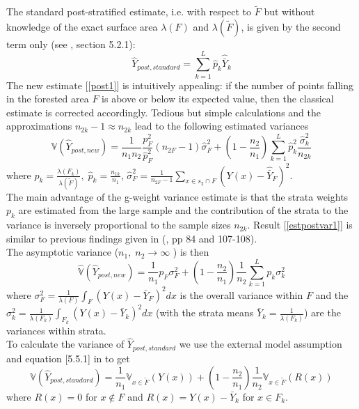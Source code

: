 \documentclass[a4paper,12pt,leqno, titlepage]{article}
\newcommand{\VAR}{\mathbb{V}}
\begin{document}
{{The standard post-stratified estimate, i.e. with respect to $\tilde{F}$ but without knowledge of the exact surface area $\lambda(F)$ and $\lambda(\tilde{F})$, is given by the second term only (see \cite{mandallaz}, section 5.2.1):
\begin{equation}\label{post2}
\hat{Y}_{post,standard}=\sum_{k=1}^L\hat{p}_k\hat{\bar{Y}}_k
\end{equation}
The new estimate [\ref{post1}] is intuitively appealing: if the number of points falling in the forested area $F$ is above or below its expected value, then the classical estimate is corrected accordingly.
Tedious but simple calculations and the approximations $ n_{2k}-1 \approx n_{2k}$ lead to the following estimated variances
\begin{equation}\label{estpostvar1}
\hat{\VAR}(\hat{Y}_{post,new})=\frac{1}{n_1n_2}\frac{p_F^2}{\hat{p}_F^2}(n_{2F}-1)\hat{\sigma}^2_F+
(1-\frac{n_2}{n_1})\sum_{k=1}^L\hat{p}^2_k\frac{\hat{\sigma}_k^2}{n_{2k}}
\end{equation}
where $p_k=\frac{\lambda(F_k)}{\lambda(\tilde{F})},\; \hat{p}_k=\frac{n_{1k}}{n_1}$,
$\hat{\sigma}_F^2=\frac{1}{n_{2F}-1}\sum_{x\in{s_2}\cap F} (Y(x)-\hat{\bar{Y}}_F)^2$.\\
The main advantage of the g-weight variance estimate is that the strata weights $p_k$ are estimated from the large sample and the contribution of the strata to the variance is inversely proportional to the sample sizes $n_{2k}$. Result [\ref{estpostvar1}] is similar to previous findings given in (\cite{mandallaz}, pp 84 and 107-108).\\
The asymptotic variance ($n_1,\; n_2 \rightarrow \infty$ ) is then
\begin{equation}\label{asymvarpostnew}
\hat{\VAR}(\hat{Y}_{post,new})=\frac{1}{n_1}p_F\sigma^2_F +
(1-\frac{n_2}{n_1})\frac{1}{n_2}\sum_{k=1}^Lp_k\sigma^2_k
\end{equation}
where $\sigma^2_F=\frac{1}{\lambda(F)}\int_F (Y(x)-\bar{Y}_F)^2dx$ is the overall variance within $F$ and the $\sigma^2_k=\frac{1}{\lambda(F_k)}\int_{F_k} (Y(x)-\bar{Y}_k)^2dx$ (with the strata means $\bar{Y}_k=\frac{1}{\lambda(F_k)}$)  are the variances within strata. \\
To calculate the variance of $\hat{Y}_{post,standard}$ we use the external model assumption and equation [5.5.1] in \cite{mandallaz} to get
$$\VAR(\hat{Y}_{post,standard})=\frac{1}{n_1}\VAR_{x\in{\tilde{F}}}(Y(x))+
(1-\frac{n_2}{n_1})\frac{1}{n_2}\VAR_{x\in{\tilde{F}}}(R(x))$$
\noindent where $R(x)=0$ for $x\not\in{F}$ and $R(x)=Y(x)-\bar{Y}_k$ for $x\in{F_k}$.\\
}}
\end{document}
